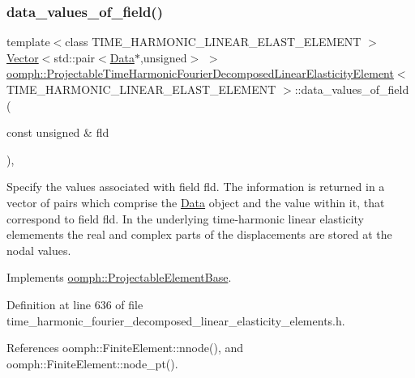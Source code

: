 \subsubsection{\texorpdfstring{data\+\_\+values\+\_\+of\+\_\+field()}{data\_values\_of\_field()}}
{\footnotesize\ttfamily template$<$class T\+I\+M\+E\+\_\+\+H\+A\+R\+M\+O\+N\+I\+C\+\_\+\+L\+I\+N\+E\+A\+R\+\_\+\+E\+L\+A\+S\+T\+\_\+\+E\+L\+E\+M\+E\+NT $>$ \\
\hyperlink{classoomph_1_1Vector}{Vector}$<$std\+::pair$<$\hyperlink{classoomph_1_1Data}{Data}$\ast$,unsigned$>$ $>$ \hyperlink{classoomph_1_1ProjectableTimeHarmonicFourierDecomposedLinearElasticityElement}{oomph\+::\+Projectable\+Time\+Harmonic\+Fourier\+Decomposed\+Linear\+Elasticity\+Element}$<$ T\+I\+M\+E\+\_\+\+H\+A\+R\+M\+O\+N\+I\+C\+\_\+\+L\+I\+N\+E\+A\+R\+\_\+\+E\+L\+A\+S\+T\+\_\+\+E\+L\+E\+M\+E\+NT $>$\+::data\+\_\+values\+\_\+of\+\_\+field (\begin{DoxyParamCaption}\item[{const unsigned \&}]{fld }\end{DoxyParamCaption})\hspace{0.3cm}{\ttfamily [inline]}, {\ttfamily [virtual]}}



Specify the values associated with field fld. The information is returned in a vector of pairs which comprise the \hyperlink{classoomph_1_1Data}{Data} object and the value within it, that correspond to field fld. In the underlying time-\/harmonic linear elasticity elemements the real and complex parts of the displacements are stored at the nodal values. 



Implements \hyperlink{classoomph_1_1ProjectableElementBase_a644306ebdf16f334344c2d27d72f18b7}{oomph\+::\+Projectable\+Element\+Base}.



Definition at line 636 of file time\+\_\+harmonic\+\_\+fourier\+\_\+decomposed\+\_\+linear\+\_\+elasticity\+\_\+elements.\+h.



References oomph\+::\+Finite\+Element\+::nnode(), and oomph\+::\+Finite\+Element\+::node\+\_\+pt().

\mbox{\label{classoomph_1_1ProjectableTimeHarmonicFourierDecomposedLinearElasticityElement_a789c16121f259adb1a04f9f283a1e277}} 
